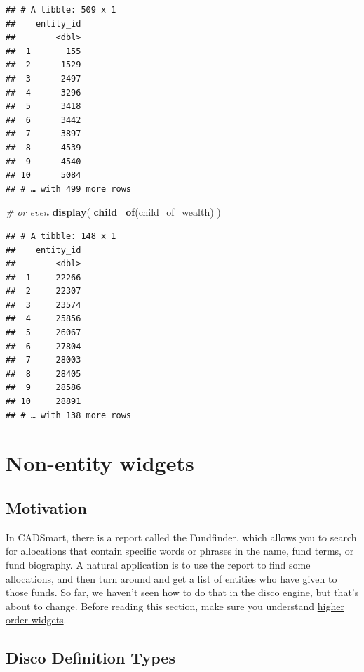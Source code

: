 \documentclass[]{book}
\newenvironment{Shaded}{\begin{snugshade}}{\end{snugshade}}
\newcommand{\CommentTok}[1]{\textcolor[rgb]{0.56,0.35,0.01}{\textit{#1}}}
\newcommand{\KeywordTok}[1]{\textcolor[rgb]{0.13,0.29,0.53}{\textbf{#1}}}
\newcommand{\NormalTok}[1]{#1}
\begin{document}
\begin{verbatim}
## # A tibble: 509 x 1
##    entity_id
##        <dbl>
##  1       155
##  2      1529
##  3      2497
##  4      3296
##  5      3418
##  6      3442
##  7      3897
##  8      4539
##  9      4540
## 10      5084
## # … with 499 more rows
\end{verbatim}

\begin{Shaded}
\begin{Highlighting}[]
\CommentTok{# or even}
\KeywordTok{display}\NormalTok{(}
    \KeywordTok{child_of}\NormalTok{(child_of_wealth)}
\NormalTok{)}
\end{Highlighting}
\end{Shaded}

\begin{verbatim}
## # A tibble: 148 x 1
##    entity_id
##        <dbl>
##  1     22266
##  2     22307
##  3     23574
##  4     25856
##  5     26067
##  6     27804
##  7     28003
##  8     28405
##  9     28586
## 10     28891
## # … with 138 more rows
\end{verbatim}

\hypertarget{non-entity-widgets}{%
\chapter{Non-entity widgets}\label{non-entity-widgets}}

\hypertarget{motivation}{%
\section{Motivation}\label{motivation}}

In CADSmart, there is a report called the Fundfinder, which allows you to search for allocations that contain specific words or phrases in the name, fund terms, or fund biography. A natural application is to use the report to find some allocations, and then turn around and get a list of entities who have given to those funds. So far, we haven't seen how to do that in the disco engine, but that's about to change. Before reading this section, make sure you understand \protect\hyperlink{higher-order-widgets}{higher order widgets}.

\hypertarget{non-entity-disco-definition-types}{%
\section{Disco Definition Types}\label{non-entity-disco-definition-types}}
\end{document}
